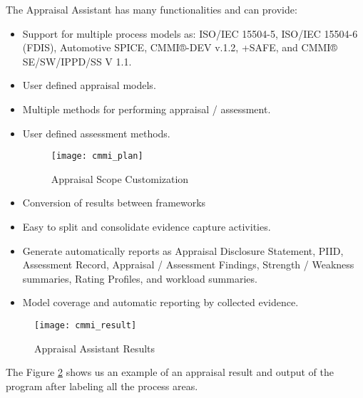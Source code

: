 The Appraisal Assistant has many functionalities and can provide:
\begin{itemize}
	\item Support for multiple process models as: ISO/IEC 15504-5, ISO/IEC 15504-6 (FDIS), Automotive SPICE, CMMI®-DEV v.1.2, +SAFE, and CMMI® SE/SW/IPPD/SS V 1.1.
	\item User defined appraisal models.
	\item Multiple methods for performing appraisal / assessment.
	\item User defined assessment methods.
	\begin{figure}[h]
		\begin{center}
			\leavevmode
			\texttt{[image: cmmi\_plan]}
			\caption{Appraisal Scope Customization}
			\label{fig:cmmi_plan}
		\end{center}
	\end{figure}
	\item Conversion of results between frameworks
	\item Easy to split and consolidate evidence capture activities.
	\item Generate automatically reports as Appraisal Disclosure Statement, PIID, Assessment Record, Appraisal / Assessment Findings, Strength / Weakness summaries, Rating Profiles, and workload summaries.
	\item Model coverage and automatic reporting by collected evidence.
\end{itemize}


\begin{figure}[h]
	\begin{center}
		\leavevmode
		\texttt{[image: cmmi\_result]}
		\caption{Appraisal Assistant Results}
		\label{fig:cmmi_result}
	\end{center}
\end{figure}

The Figure \ref{fig:cmmi_result} shows us an example of an appraisal result and output of the program after labeling all the process areas.
